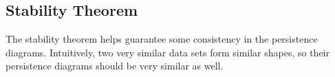 \subsection{Stability Theorem}\label{sec:stability-theorem}

The stability theorem helps guarantee some consistency in the persistence diagrams. Intuitively, two very similar data sets form similar shapes, so their persistence diagrams should be very similar as well.

\begin{theorem}
\end{theorem}




